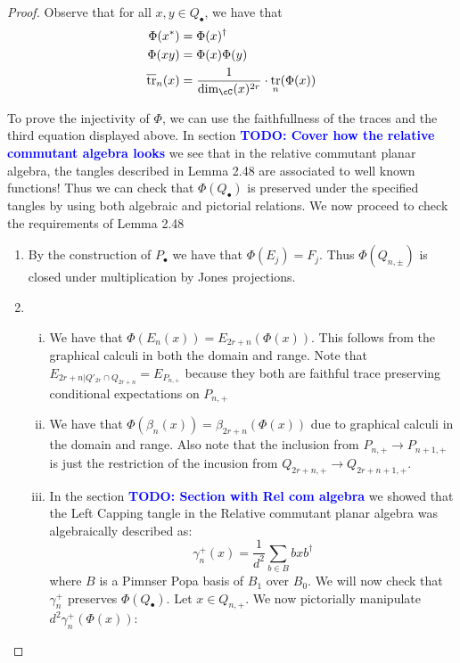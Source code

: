 \documentclass[11pt]{article}
\theoremstyle{plain}
\theoremstyle{definition}
\DeclareMathOperator{\tr}{tr}
\newcommand{\todo}[1]{\textcolor{blue}{\textbf{TODO: #1}}}
\begin{document}
\begin{proof}
Observe that for all $x,y \in Q_{\bullet}$, we have that 
\begin{align*}
	\Phi(x^{*}) &= \Phi(x)^{\dagger} \\
	\Phi(xy) &= \Phi(x)\Phi(y) \\
	\overline{\tr}_{n}(x) &= \frac{1}{\dim_\cC(x)^{2r}}\cdot\tr_{n}(\Phi(x)) 
\end{align*}

To prove the injectivity of $\Phi$, we can use the faithfullness of the traces and the third equation displayed above. In section \todo{Cover how the relative commutant algebra looks} we see that in the relative commutant planar algebra, the tangles described in Lemma 2.48 are associated to well known functions! Thus we can check that $\Phi(Q_\bullet)$ is preserved under the specified tangles by using both algebraic and pictorial relations. We now proceed to check the requirements of Lemma 2.48  
\begin{enumerate}[(1)]
\item By the construction of $P_{\bullet}$ we have that $\Phi(E_j)=F_j$. Thus $\Phi(Q_{n,\pm})$ is closed under multiplication by Jones projections. 
\item \begin{enumerate}[(i)]
\item We have that $\Phi(E_n(x)) = E_{2r+n}(\Phi(x))$. This follows from the graphical calculi in both the domain and range. Note that $E_{2r+n | Q'_{2r}\cap Q_{2r+n}} = E_{P_{n,+}}$ because they both are faithful trace preserving conditional expectations on $P_{n,+}$
\item We have that $\Phi(\beta_n(x)) = \beta_{2r+n}(\Phi(x))$ due to graphical calculi in the domain and range. Also note that the inclusion from $P_{n,+} \to P_{n+1,+}$ is just the restriction of the incusion from $Q_{2r+n,+} \to Q_{2r+n+1,+}$. 
\item In the section \todo{Section with Rel com algebra} we showed that the Left Capping tangle in the Relative commutant planar algebra was algebraically described as:
\[
 \gamma^{+}_n(x) = \frac{1}{d^2}\sum_{b \in B}bxb^\dagger
\]
where $B$ is a Pimnser Popa basis of $B_1$ over $B_0$. We will now check that $\gamma^{+}_n$ preserves $\Phi(Q_{\bullet})$. Let $x \in Q_{n,+}$. We now pictorially manipulate $d^2\gamma^{+}_n(\Phi(x))$:


\end{enumerate}
\end{enumerate}
\end{proof}
\end{document}
